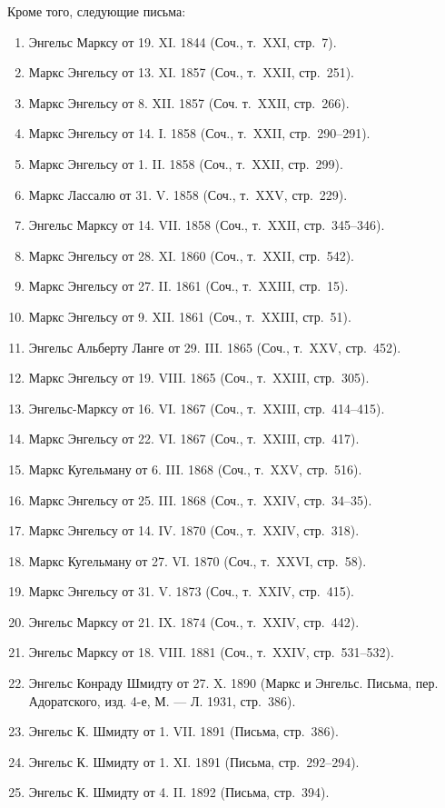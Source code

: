 \documentclass[twoside]{article}
\begin{document}
Кроме того, следующие письма:
\begin{enumerate}
\item 
Энгельс Марксу от 19. XI. 1844 (Соч., т.~XXI, стр.~7).
\item 
Маркс Энгельсу от 13. XI. 1857 (Соч., т.~XXII, стр.~251).
\item 
Маркс Энгельсу от 8. XII. 1857 (Соч. т.~XXII, стр.~266).
\item 
Маркс Энгельсу от 14. I. 1858 (Соч., т.~XXII, стр.~290–291).
\item 
Маркс Энгельсу от 1. II. 1858 (Соч., т.~XXII, стр.~299).
\item 
Маркс Лассалю от 31. V. 1858 (Соч., т.~XXV, стр.~229).
\item 
Энгельс Марксу от 14. VII. 1858 (Соч., т.~XXII, стр.~345–346).
\item 
Маркс Энгельсу от 28. XI. 1860 (Соч., т.~XXII, стр.~542).
\item 
Маркс Энгельсу от 27. II. 1861 (Соч., т.~XXIII, стр.~15).
\item 
Маркс Энгельсу от 9. XII. 1861 (Соч., т.~XXIII, стр.~51).
\item 
Энгельс Альберту Ланге от 29. III. 1865 (Соч., т.~XXV, стр.~452).
\item 
Маркс Энгельсу от 19. VIII. 1865 (Соч., т.~XXIII, стр.~305).
\item 
Энгельс-Марксу от 16. VI. 1867 (Соч., т.~XXIII, стр.~414–415).
\item 
Маркс Энгельсу от 22. VI. 1867 (Соч., т.~XXIII, стр.~417).
\item 
Маркс Кугельману от 6. III. 1868 (Соч., т.~XXV, стр.~516).
\item 
Маркс Энгельсу от 25. III. 1868 (Соч., т.~XXIV, стр.~34–35).
\item 
Маркс Энгельсу от 14. IV. 1870 (Соч., т.~XXIV, стр.~318).
\item 
Маркс Кугельману от 27. VI. 1870 (Соч., т.~XXVI, стр.~58).
\item 
Маркс Энгельсу от 31. V. 1873 (Соч., т.~XXIV, стр.~415).
\item 
Энгельс Марксу от 21. IX. 1874 (Соч., т.~XXIV, стр.~442).
\item 
Энгельс Марксу от 18. VIII. 1881 (Соч., т.~XXIV, стр.~531–532).
\item 
Энгельс Конраду Шмидту от 27. X. 1890 (Маркс и Энгельс. Письма, 
пер. Адоратского, изд. 4-е, М. — Л. 1931, стр.~386).
\item 
Энгельс К. Шмидту от 1. VII. 1891 (Письма, стр.~386).
\item 
Энгельс К. Шмидту от 1. XI. 1891 (Письма, стр.~292–294).
\item 
Энгельс К. Шмидту от 4. II. 1892 (Письма, стр.~394).
\end{enumerate}
\end{document}
